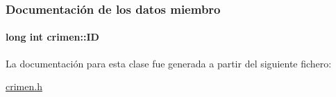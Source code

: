\subsubsection{Documentación de los datos miembro}
\hypertarget{classcrimen_a59702f88f0b0c25781ae3d296790dcb8}{
\paragraph[{I\-D}]{\setlength{\rightskip}{0pt plus 5cm}long int crimen\-::\-I\-D\hspace{0.3cm}{\ttfamily [private]}}}\label{classcrimen_a59702f88f0b0c25781ae3d296790dcb8}


La documentación para esta clase fue generada a partir del siguiente fichero\-:\begin{DoxyCompactItemize}
\item 
\hyperlink{crimen_8h}{crimen.\-h}\end{DoxyCompactItemize}
